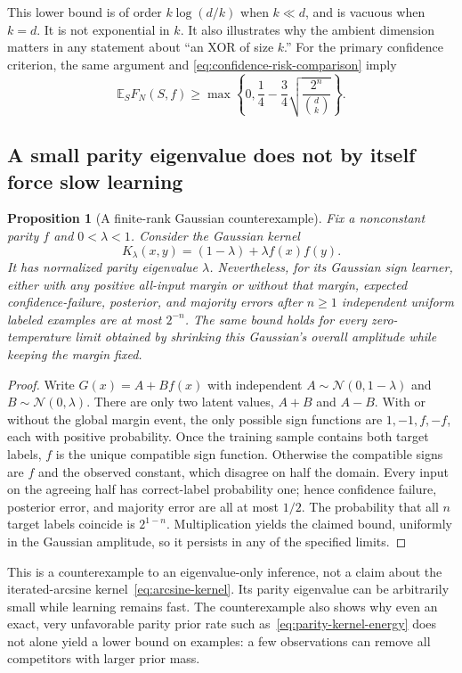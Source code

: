 \documentclass[11pt]{article}
\newtheorem{proposition}[theorem]{Proposition}
\theoremstyle{remark}
\begin{document}
This lower bound is of order $k\log(d/k)$ when $k\ll d$, and is
vacuous when $k=d$. It is not exponential in $k$. It also illustrates
why the ambient dimension matters in any statement about ``an XOR of
size $k$.''
For the primary confidence criterion, the same argument and
\eqref{eq:confidence-risk-comparison} imply
\[
 \mathbb E_S F_N(S,f)\ge
 \max\left\{0,\frac14-\frac34\sqrt{\frac{2^n}{\binom dk}}\right\}.
\]



\subsection{A small parity eigenvalue does not by itself force slow learning}

\begin{proposition}[A finite-rank Gaussian counterexample]
\label{prop:rank-two-counterexample}
Fix a nonconstant parity $f$ and $0<\lambda<1$. Consider the Gaussian
kernel
\[
 K_\lambda(x,y)=(1-\lambda)+\lambda f(x)f(y).
\]
It has normalized parity eigenvalue $\lambda$. Nevertheless, for its
Gaussian sign learner, either with any positive all-input margin or
without that margin, expected confidence-failure, posterior, and majority errors after
$n\ge1$ independent uniform labeled examples are at most $2^{-n}$.
The same bound holds for every zero-temperature limit obtained by
shrinking this Gaussian's overall amplitude while keeping the margin
fixed.
\end{proposition}

\begin{proof}
Write $G(x)=A+Bf(x)$ with independent
$A\sim\mathcal N(0,1-\lambda)$ and $B\sim\mathcal N(0,\lambda)$.
There are only two latent values, $A+B$ and $A-B$. With or without the
global margin event, the only possible sign functions are
$1,-1,f,-f$, each with positive probability. Once the training sample
contains both target labels, $f$ is the unique compatible sign
function. Otherwise the compatible signs are $f$ and the observed
constant, which disagree on half the domain. Every input on the
agreeing half has correct-label probability one; hence confidence
failure, posterior error, and majority error are all at most $1/2$.
The probability that all $n$ target
labels coincide is $2^{1-n}$. Multiplication yields the claimed bound,
uniformly in the Gaussian amplitude, so it persists in any of the
specified limits.
\end{proof}

This is a counterexample to an eigenvalue-only inference, not a claim
about the iterated-arcsine kernel~\eqref{eq:arcsine-kernel}. Its parity
eigenvalue can be arbitrarily small while learning remains fast. The
counterexample also shows why even an exact, very unfavorable parity
prior rate such as~\eqref{eq:parity-kernel-energy} does not alone yield
a lower bound on examples: a few observations can remove all
competitors with larger prior mass.
\end{document}
